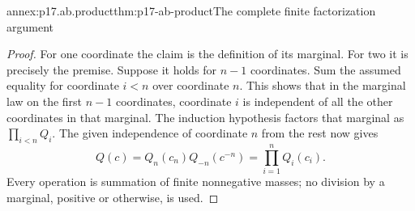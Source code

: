 \begin{annexitem}{annex:p17.ab.product}{thm:p17-ab-product}{The complete finite factorization argument}
\begin{proof}
For one coordinate the claim is the definition of its marginal.
For two it is precisely the premise. Suppose it holds for
\(n-1\) coordinates. Sum the assumed equality for coordinate
\(i<n\) over coordinate \(n\). This shows that in the marginal
law on the first \(n-1\) coordinates, coordinate \(i\) is
independent of all the other coordinates in that marginal.
The induction hypothesis factors that marginal as
\(\prod_{i<n}Q_i\). The given independence of coordinate
\(n\) from the rest now gives
\[
 Q(c)=Q_n(c_n)Q_{-n}(c^{-n})=\prod_{i=1}^nQ_i(c_i).
\]
Every operation is summation of finite nonnegative masses;
no division by a marginal, positive or otherwise, is used.
\end{proof}
\end{annexitem}

